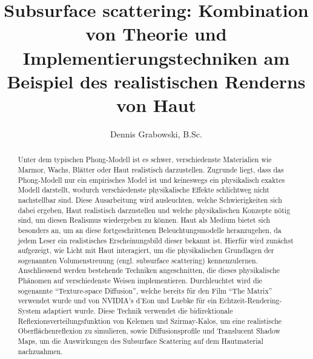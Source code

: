 \documentclass[ngerman,runningheads,a4paper]{llncs}[2018/03/10]
\begin{document}
\title{Subsurface scattering: Kombination von Theorie und Implementierungstechniken am Beispiel des realistischen Renderns von Haut}
{}

\author{Dennis Grabowski, B.Sc.}
{}


\maketitle

\begin{abstract}

Unter dem typischen Phong-Modell ist es schwer, verschiedenste Materialien wie Marmor, Wachs, Blätter oder Haut realistisch dar\-zu\-stellen.
Zugrunde liegt, dass das Phong-Modell nur ein empirisches Model ist und keineswegs ein physikalisch exaktes Modell darstellt, wodurch verschiedenste physikalische Effekte schlichtweg nicht nachstellbar sind.
Diese Ausarbeitung wird ausleuchten, welche Schwierigkeiten sich dabei ergeben, Haut realistisch darzustellen und welche physikalischen Konzepte nötig sind, um diesen Realismus wiedergeben zu können.
Haut als Medium bietet sich besonders an, um an diese fortgeschrittenen Beleuchtungsmodelle heranzugehen, da jedem Leser ein realistisches Erscheinungsbild dieser bekannt ist.
Hierfür wird zunächst aufgezeigt, wie Licht mit Haut interagiert, um die physikalischen Grundlagen der sogenannten Volumenstreuung (engl. subsurface scattering) kennenzulernen.
Anschliessend werden bestehende Techniken angeschnitten, die dieses physikalische Phänomen auf verschiedenste Weisen implementieren.
Durchleuchtet wird die sogenannte \enquote{Texture-space Diffusion}, welche bereits für den Film \enquote{The Matrix} verwendet wurde und von NVIDIA's d'Eon und Luebke für ein Echtzeit-Rendering-System adaptiert wurde.
Diese Technik verwendet die bidirektionale Reflexionsverteilungsfunktion von Kelemen und Szirmay-Kalos, um eine realistische Oberflächenreflexion zu simulieren, sowie Diffusionsprofile und Translucent Shadow Maps, um die Auswirkungen des Subsurface Scattering auf dem Hautmaterial nachzuahmen.

\end{abstract}
\end{document}
